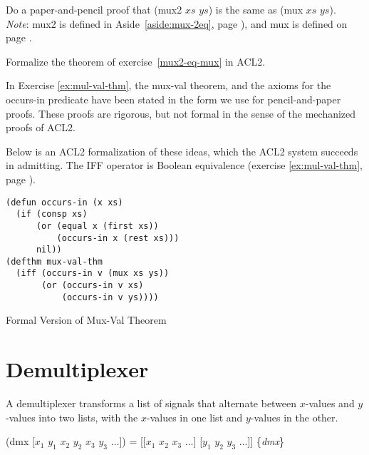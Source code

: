 \begin{ExerciseList}
\Exercise
\label{mux2-eq-mux}
Do a paper-and-pencil proof that
(mux2 $xs$ $ys$) is the same as (mux $xs$ $ys$).\\
\emph{Note}: mux2 is defined in
Aside~\ref{aside:mux-2eq}, page \pageref{aside:mux-2eq}),
and mux is defined on page \pageref{mux-defun}.

\Exercise
Formalize the theorem of exercise~\ref{mux2-eq-mux} in ACL2.

\end{ExerciseList}

\begin{aside}
In Exercise \ref{ex:mul-val-thm}, the mux-val theorem,
and the axioms for the occurs-in predicate
have been stated in the form we use for pencil-and-paper proofs.
These proofs are rigorous, but not formal
in the sense of the mechanized proofs of ACL2.

Below is an ACL2 formalization of these ideas,
which the ACL2 system succeeds in admitting.
\label{acl2:iff}
The
IFF operator
is Boolean equivalence
(exercise \ref{ex:mul-val-thm}, page \pageref{def:equivalence-op}).
\\

\label{defun:occurs-in}
\begin{Verbatim}
(defun occurs-in (x xs)
  (if (consp xs)
      (or (equal x (first xs))
          (occurs-in x (rest xs)))
      nil))
(defthm mux-val-thm
  (iff (occurs-in v (mux xs ys))
       (or (occurs-in v xs)
           (occurs-in v ys))))
\end{Verbatim}
\label{defthm:mux-val}
\caption{Formal Version of Mux-Val Theorem}
\label{aside:mux-val-thm}
\end{aside}


\section{Demultiplexer}
\label{sec:dmx}

A demultiplexer transforms a list of signals that alternate between
$x$-values and $y$-values into two lists,
with the $x$-values in one list and $y$-values in the other.

\hspace{1cm} (dmx [$x_1$ $y_1$ $x_2$ $y_2$ $x_3$ $y_3$ $\dots$]) =
[[$x_1$ $x_2$ $x_3$ $\dots$] [$y_1$ $y_2$ $y_3$ $\dots$]]
\hfill \{\emph{dmx}\}

